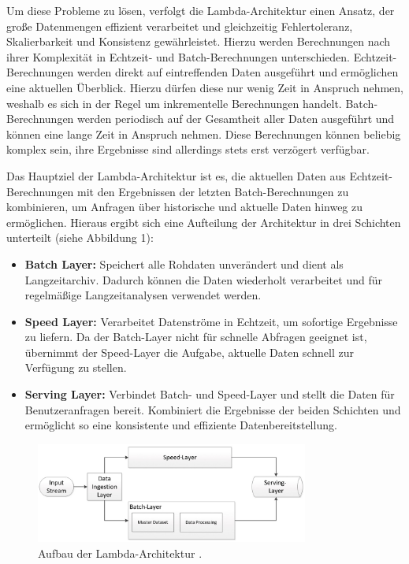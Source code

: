 Um diese Probleme zu lösen, verfolgt die Lambda-Architektur einen Ansatz, der große Datenmengen effizient verarbeitet und gleichzeitig Fehlertoleranz, Skalierbarkeit und Konsistenz gewährleistet.
Hierzu werden Berechnungen nach ihrer Komplexität in Echtzeit- und Batch-Berechnungen unterschieden.
Echtzeit-Berechnungen werden direkt auf eintreffenden Daten ausgeführt und ermöglichen eine aktuellen Überblick.
Hierzu dürfen diese nur wenig Zeit in Anspruch nehmen, weshalb es sich in der Regel um inkrementelle Berechnungen handelt.
Batch-Berechnungen werden periodisch auf der Gesamtheit aller Daten ausgeführt und können eine lange Zeit in Anspruch nehmen.
Diese Berechnungen können beliebig komplex sein, ihre Ergebnisse sind allerdings stets erst verzögert verfügbar.

Das Hauptziel der Lambda-Architektur ist es, 
die aktuellen Daten aus Echtzeit-Berechnungen mit den Ergebnissen der letzten Batch-Berechnungen zu kombinieren,
um Anfragen über historische und aktuelle Daten hinweg zu ermöglichen.
Hieraus ergibt sich eine Aufteilung der Architektur in drei Schichten unterteilt (siehe Abbildung 1):

\begin{itemize}
	\item \textbf{Batch Layer:} Speichert alle Rohdaten unverändert und dient als Langzeitarchiv. Dadurch können die Daten wiederholt verarbeitet und für regelmäßige Langzeitanalysen verwendet werden.
	\item \textbf{Speed Layer:} Verarbeitet Datenströme in Echtzeit, um sofortige Ergebnisse zu liefern. Da der Batch-Layer nicht für schnelle Abfragen geeignet ist, übernimmt der Speed-Layer die Aufgabe, aktuelle Daten schnell zur Verfügung zu stellen.
	\item \textbf{Serving Layer:} Verbindet Batch- und Speed-Layer und stellt die Daten für Benutzeranfragen bereit. Kombiniert die Ergebnisse der beiden Schichten und ermöglicht so eine konsistente und effiziente Datenbereitstellung.
\end{itemize}


\begin{figure}[h]
    \centering
    \includegraphics[width=0.8\textwidth]{Graphics/Lambda_Architecture.png}
    \caption{Aufbau der Lambda-Architektur \cite{entwickler_lambda_kappa}.}
    \label{fig:beispielbild}
\end{figure}

